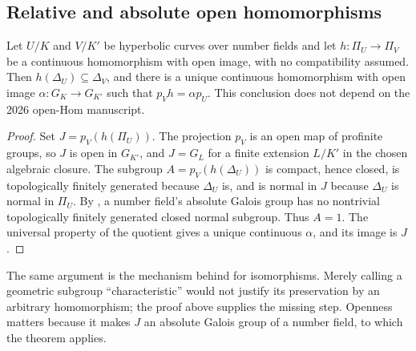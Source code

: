 \subsection{Relative and absolute open homomorphisms}

Let $U/K$ and $V/K'$ be hyperbolic curves over number fields and let
$h:\Pi_U\to\Pi_V$ be a continuous homomorphism with open image, with no
compatibility assumed.  Then $h(\Delta_U)\subseteq\Delta_V$, and there is a
unique continuous homomorphism with open image
$\alpha:G_K\to G_{K'}$ such that $p_Vh=\alpha p_U$.
This conclusion does not depend on the 2026 open-Hom manuscript.
\begin{proof}
Set $J=p_V(h(\Pi_U))$.  The projection $p_V$ is an open map of profinite
groups, so $J$ is open in $G_{K'}$, and $J=G_L$ for a finite extension
$L/K'$ in the chosen algebraic closure.  The subgroup
$A=p_V(h(\Delta_U))$ is compact, hence closed, is topologically finitely
generated because $\Delta_U$ is, and is normal in $J$ because $\Delta_U$
is normal in $\Pi_U$.  By \citet[Theorem 2.4]{Mochizuki2006}, a number
field's absolute Galois group has no nontrivial topologically finitely
generated closed normal subgroup.  Thus $A=1$.  The universal property of
the quotient gives a unique continuous $\alpha$, and its image is $J$.
\end{proof}
The same argument is the mechanism behind
\citet[Proposition 3.3]{Mochizuki2006} for isomorphisms.  Merely calling a
geometric subgroup ``characteristic'' would not justify its preservation
by an arbitrary homomorphism; the proof above supplies the missing step.
Openness matters because it makes $J$ an absolute Galois group of a number
field, to which the theorem applies.

